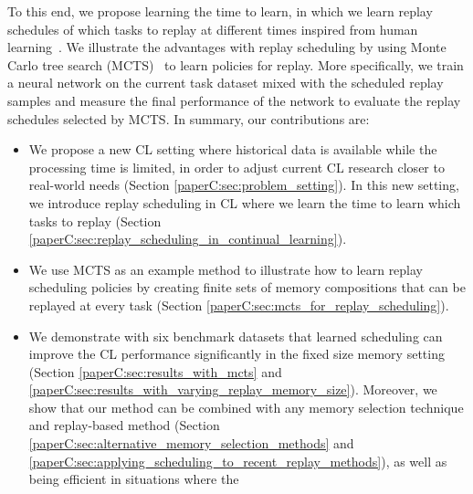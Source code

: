 To this end, we propose learning the time to learn, in which we learn replay schedules of which tasks to replay at different times inspired from human learning~. 
We illustrate the advantages with replay scheduling by using Monte Carlo tree search (MCTS)~ to learn policies for replay. 
More specifically, we train a neural network on the current task dataset mixed with the scheduled replay samples and measure the final performance of the network to evaluate the replay schedules selected by MCTS. 
In summary, our contributions are:
\begin{itemize}[topsep=1pt,] %
    \setlength\itemsep{0.1mm}
    \item We propose a new CL setting where historical data is available while the processing time is limited, in order to adjust current CL research closer to real-world needs (Section \ref{paperC:sec:problem_setting}). In this new setting, we introduce replay scheduling in CL where we learn the time to learn which tasks to replay (Section \ref{paperC:sec:replay_scheduling_in_continual_learning}).
    \item We use MCTS as an example method to illustrate how to learn replay scheduling policies by creating finite sets of memory compositions that can be replayed at every task (Section \ref{paperC:sec:mcts_for_replay_scheduling}).
    \item We demonstrate with six benchmark datasets that learned scheduling can improve the CL performance significantly in the fixed size memory setting (Section \ref{paperC:sec:results_with_mcts} and \ref{paperC:sec:results_with_varying_replay_memory_size}). Moreover, we show that our method can be combined with any memory selection technique and replay-based method (Section \ref{paperC:sec:alternative_memory_selection_methods} and \ref{paperC:sec:applying_scheduling_to_recent_replay_methods}), as well as being efficient in situations where the 

\end{itemize}

